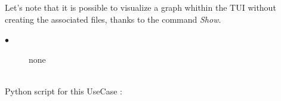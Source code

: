 Let's note that it is possible to visualize a graph whithin the TUI without creating the associated files, thanks to the command {\itshape Show}.\\

\noindent%
{
  \begin{description}
  \item[$\bullet$] none
  \end{description}
}

\textspace\\
Python script for this UseCase :

